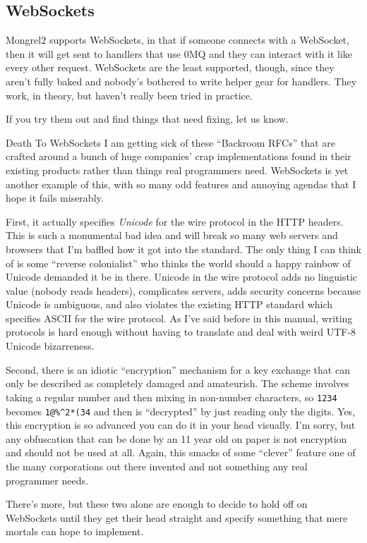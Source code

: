\subsection{WebSockets}

Mongrel2 supports WebSockets, in that if someone connects with a WebSocket, then it will get
sent to handlers that use 0MQ and they can interact with it like every other request.  WebSockets
are the least supported, though, since they aren't fully baked and nobody's bothered to write
helper gear for handlers.  They work, in theory, but haven't really been tried in practice.

If you try them out and find things that need fixing, let us know.

\begin{aside}{Death To WebSockets}
I am getting sick of these ``Backroom RFCs'' that are crafted around a bunch of huge
companies' crap implementations found in their existing products rather than things
real programmers need.  WebSockets is yet another example of this, with so many odd
features and annoying agendas that I hope it fails miserably.

First, it actually specifies \emph{Unicode} for the wire protocol in the HTTP headers.
This is such a monumental bad idea and will break so many web servers and browsers that
I'm baffled how it got into the standard.  The only thing I can think of is some ``reverse colonialist''
who thinks the world should a happy rainbow of Unicode demanded it be in there.  Unicode in
the wire protocol adds no linguistic value (nobody reads headers), complicates servers,
adds security concerns because Unicode is ambiguous, and also violates the existing HTTP standard
which specifies ASCII for the wire protocol.  As I've said before in this manual, writing
protocols is hard enough without having to translate and deal with weird UTF-8 Unicode bizarreness.

Second, there is an idiotic ``encryption'' mechanism for a key exchange that can only be
described as completely damaged and amateurish.  The scheme involves taking a regular
number and then mixing in non-number characters, so \verb|1234| becomes \verb|1@%^2*(34| and then is
``decrypted'' by just reading only the digits.  Yes, this encryption is so advanced you can do it
in your head visually.  I'm sorry, but any obfuscation that can be done by an 11 year old on
paper is not encryption and should not be used at all.  Again, this smacks of some ``clever'' feature
one of the many corporations out there invented and not something any real programmer needs.

There's more, but these two alone are enough to decide to hold off on WebSockets until
they get their head straight and specify something that mere mortals can hope to implement.
\end{aside}

